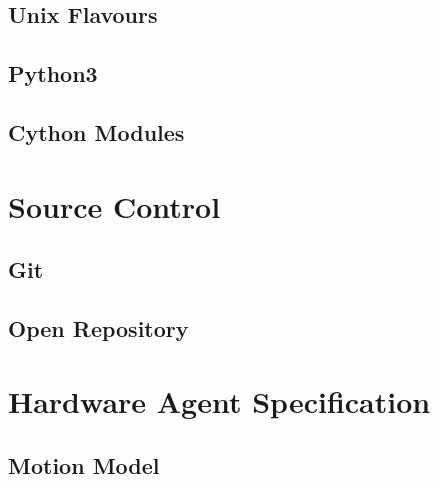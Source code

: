 \subsection{Unix Flavours}

\subsection{Python3}

\subsection{Cython Modules}

\newpage


\section{Source Control}

\subsection{Git}

\subsection{Open Repository}

\newpage


\section{Hardware Agent Specification}

\subsection{Motion Model}

\newpage

